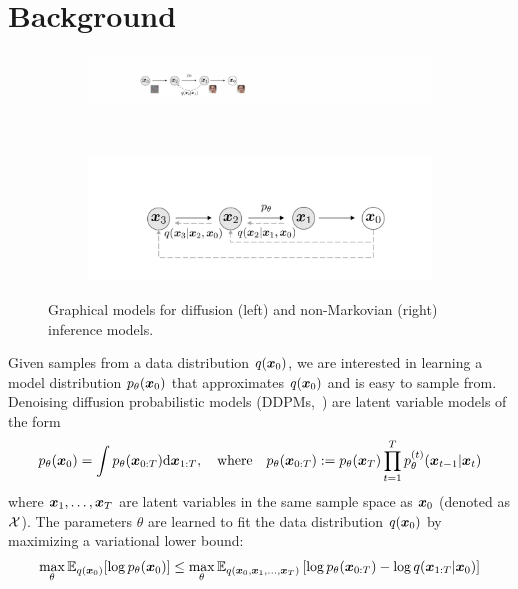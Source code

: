 \section{Background}
\label{sec:background}
\begin{figure}
    \centering
    \begin{subfigure}{0.45\textwidth}
    \includegraphics[width=\textwidth]{figures/diffusion-orig.pdf}
    \end{subfigure}
    ~
    \begin{subfigure}{0.45\textwidth}
    \includegraphics[width=\textwidth]{figures/diffusion-generalized.pdf}
    \end{subfigure}
    \caption{Graphical models for diffusion (left) and non-Markovian (right) inference models.}
    \label{fig:diffusion}
\end{figure}
Given samples from a data distribution $q({\bm{x}}_0)$, we are interested in learning a model distribution $p_\theta({\bm{x}}_0)$ that approximates $q({\bm{x}}_0)$ and is easy to sample from. 
Denoising diffusion probabilistic models (DDPMs,~\citet{sohl-dickstein2015deep,ho2020denoising}) are latent variable models of the form
\begin{align}
    p_\theta({\bm{x}}_0) = \int p_\theta({\bm{x}}_{0:T}) \mathrm{d} {\bm{x}}_{1:T}, \quad \text{where} \quad  p_\theta({\bm{x}}_{0:T}) := p_\theta({\bm{x}}_T) \prod_{t=1}^{T} p^{(t)}_\theta({\bm{x}}_{t-1} | {\bm{x}}_t) \label{eq:gen}
\end{align}
where ${\bm{x}}_1, \ldots, {\bm{x}}_T$ are latent variables in the same sample space as ${\bm{x}}_0$ (denoted as ${\mathcal{X}}$). The parameters $\theta$ are learned to fit the data distribution $q({\bm{x}}_0)$ by maximizing a variational lower bound: %
\begin{align}
    \max_\theta {\mathbb{E}}_{q({\bm{x}}_0)}[\log p_\theta({\bm{x}}_0)] \leq \max_\theta {\mathbb{E}}_{q({\bm{x}}_0, {\bm{x}}_1, \ldots, {\bm{x}}_T)}\left[\log p_\theta({\bm{x}}_{0:T}) - \log q({\bm{x}}_{1:T} | {\bm{x}}_0) \right] \label{eq:elbo}
\end{align}
